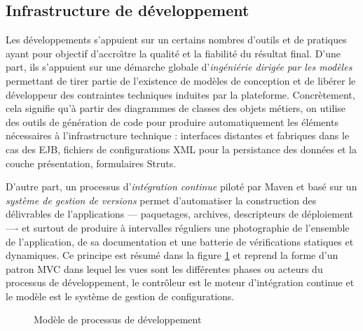 \subsection{Infrastructure de d\'eveloppement}

Les d\'eveloppements s'appuient sur un certains nombres d'outils et
de pratiques ayant pour objectif d'accro\^{\i}tre la qualit\'e et la
fiabilit\'e du r\'esultat final. D'une part, ils s'appuient sur une
d\'emarche globale d'\emph{ing\'eni\'erie dirig\'ee par les
  mod\`eles} permettant de tirer partie de l'existence de mod\`eles
de conception et de lib\'erer le d\'eveloppeur des contraintes
techniques induites par la plateforme. Concr\`etement, cela signifie
qu'\`a partir des diagrammes de classes des objets m\'etiers, on utilise des outils de g\'en\'eration de code pour
produire automatiquement les \'el\'ements n\'ecessaires \`a
l'infrastructure technique : interfaces distantes et fabriques dans le
cas des \textsf{EJB}, fichiers de configurations \textsf{XML} pour la
persistance des donn\'ees et la couche pr\'esentation, formulaires
\textsf{Struts}.

D'autre part, un processus d'\emph{int\'egration continue} pilot\'e
par \textsf{Maven} et bas\'e
sur un \emph{syst\`eme de gestion de versions} permet d'automatiser
la construction des d\'elivrables de l'applications --- paquetages,
archives, descripteurs de d\'eploiement ---- et surtout de produire
\`a intervalles r\'eguliers une photographie de l'ensemble de
l'application, de sa documentation et une batterie de
v\'erifications statiques et dynamiques. Ce principe est r\'esum\'e
dans la figure \ref{fig-develmvc} et reprend la forme d'un patron
\textsf{MVC} dans lequel les vues sont les diff\'erentes phases ou
acteurs du processus de d\'eveloppement, le contr\^oleur est le
moteur d'int\'egration continue et le mod\`ele est le syst\`eme de
gestion de configurations.  

\begin{figure}[htbp]
    \centering
    \caption{Mod\`ele de processus de d\'eveloppement}
    \label{fig-develmvc}
\end{figure}

